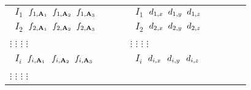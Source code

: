\documentclass[10pt]{report}
\begin{document}
\begin{itemize}
\begin{center}
\begin{tabular}{p{0.4\linewidth}p{0.4\linewidth}}
        {\tt \hspace{0.2cm} $I_{1}$\hspace{0.3cm}  $ f_{1,\textbf{A}_1} \hspace{0.2cm} f_{1,\textbf{A}_2} \hspace{0.2cm} f_{1,\textbf{A}_3}  $}  &
        {\tt \hspace{0.2cm} $I_{1}$\hspace{0.3cm}  $ d_{1,x} \hspace{0.2cm} d_{1,y} \hspace{0.2cm} d_{1,z} $}  \\
        {\tt \hspace{0.2cm} $I_{2}$\hspace{0.3cm}  $ f_{2,\textbf{A}_1} \hspace{0.2cm} f_{2,\textbf{A}_2} \hspace{0.2cm} f_{2,\textbf{A}_3}  $}  &
        {\tt \hspace{0.2cm} $I_{2}$\hspace{0.3cm}  $ d_{2,x} \hspace{0.2cm} d_{2,y} \hspace{0.2cm} d_{2,z} $}  \\
           \hspace{0.3cm}  $\vdots$ \hspace{0.9cm}    $\vdots$ \hspace{0.45cm} $\vdots$ \hspace{0.45cm} $\vdots$              &   
           \hspace{0.3cm}  $\vdots$ \hspace{0.7cm}    $\vdots$ \hspace{0.45cm} $\vdots$ \hspace{0.55cm} $\vdots$  \\
        {\tt \hspace{0.2cm} $I_{i}$\hspace{0.35cm}  $ f_{i,\textbf{A}_1} \hspace{0.25cm} f_{i,\textbf{A}_2} \hspace{0.2cm} f_{i,\textbf{A}_3} $}  &
        {\tt \hspace{0.2cm} $I_{i}$\hspace{0.35cm}  $ d_{i,x} \hspace{0.25cm} d_{i,y} \hspace{0.25cm} d_{i,z} $}  \\
           \hspace{0.3cm}  $\vdots$ \hspace{0.9cm}    $\vdots$ \hspace{0.45cm} $\vdots$ \hspace{0.45cm} $\vdots$              &   

\end{tabular}
\end{center}
\end{itemize}
\end{document}
